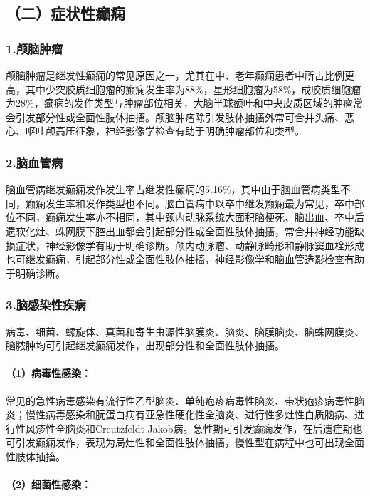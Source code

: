 \subsection{（二）症状性癫痫}

\subsubsection{1.颅脑肿瘤}

颅脑肿瘤是继发性癫痫的常见原因之一，尤其在中、老年癫痫患者中所占比例更高，其中少突胶质细胞瘤的癫痫发生率为88\%，星形细胞瘤为58\%，成胶质细胞瘤为28\%，癫痫的发作类型与肿瘤部位相关，大脑半球额叶和中央皮质区域的肿瘤常会引发部分性或全面性肢体抽搐。颅脑肿瘤除引发肢体抽搐外常可合并头痛、恶心、呕吐颅高压征象，神经影像学检查有助于明确肿瘤部位和类型。

\subsubsection{2.脑血管病}

脑血管病继发癫痫发作发生率占继发性癫痫的5.16\%，其中由于脑血管病类型不同，癫痫发生率和发作类型也不同。脑血管病中以卒中继发癫痫最为常见，卒中部位不同，癫痫发生率亦不相同，其中颈内动脉系统大面积脑梗死、脑出血、卒中后遗软化灶、蛛网膜下腔出血都会引起部分性或全面性肢体抽搐，常合并神经功能缺损症状，神经影像学有助于明确诊断。颅内动脉瘤、动静脉畸形和静脉窦血栓形成也可继发癫痫，引起部分性或全面性肢体抽搐，神经影像学和脑血管造影检查有助于明确诊断。

\subsubsection{3.脑感染性疾病}

病毒、细菌、螺旋体、真菌和寄生虫源性脑膜炎、脑炎、脑膜脑炎、脑蛛网膜炎、脑脓肿均可引起继发癫痫发作，出现部分性和全面性肢体抽搐。

\paragraph{（1）病毒性感染：}

常见的急性病毒感染有流行性乙型脑炎、单纯疱疹病毒性脑炎、带状疱疹病毒性脑炎；慢性病毒感染和朊蛋白病有亚急性硬化性全脑炎、进行性多灶性白质脑病、进行性风疹性全脑炎和Creutzfeldt-Jakob病。急性期可引发癫痫发作，在后遗症期也可引发癫痫发作，表现为局灶性和全面性肢体抽搐，慢性型在病程中也可出现全面性肢体抽搐。

\paragraph{（2）细菌性感染：}

